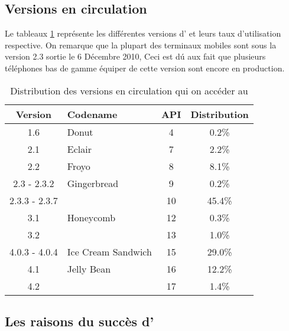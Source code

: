 
\subsection{Versions \android{} en circulation}
Le tableaux \ref{tab:androidversion} représente les différentes versions
d'\android{} et leurs taux d'utilisation respective. On remarque que
la plupart des terminaux mobiles \android{} sont sous la version 2.3
 sortie le 6 Décembre 2010, Ceci est dú aux fait que
plusieurs téléphones bas de gamme équiper de cette version sont encore
en production.

\begin{table}[H]
\centering
\begin{tabular}{|c|l|c|c|}
\hline
\textsf{Version} & \textsf{Codename} & \textsf{API} &
\textsf{Distribution}\\
\hline
1.6 & Donut & 4 & 0.2\%\\
\hline
2.1 & Eclair & 7 & 2.2\%\\
\hline
2.2 & Froyo & 8 & 8.1\%\\
\hline
2.3 - 2.3.2 & Gingerbread & 9 & 0.2\% \\
\cline{1-1}\cline{3-4}
2.3.3 - 2.3.7 & & 10 & 45.4\%\\
\hline
3.1 & Honeycomb & 12 & 0.3\%\\
\cline{1-1}\cline{3-4}
3.2 & & 13 & 1.0\%\\
\hline
4.0.3 - 4.0.4 & Ice Cream Sandwich & 15 & 29.0\%\\
\hline
4.1 & Jelly Bean & 16 & 12.2\%\\
\cline{1-1}\cline{3-4}
4.2 & & 17 & 1.4\%\\
\hline
\end{tabular}
\caption{Distribution des versions \android{} en circulation qui on
accéder au \protect\footnotemark[5]}
\label{tab:androidversion}
\end{table}


\subsection[Les raisons du succès d'\android{}]{Les raisons du succès d'\android{}\cite{lft:growth_android}}

